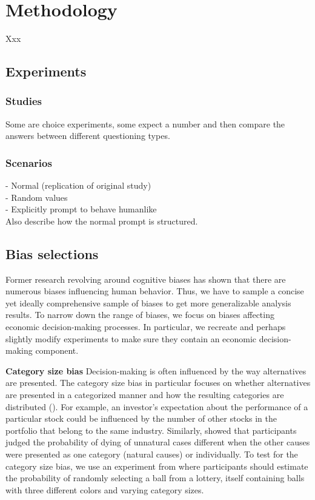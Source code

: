 \section{Methodology}
Xxx

\subsection{Experiments}
\subsubsection{Studies}
Some are choice experiments, some expect a number and then compare the answers between different questioning types.

\subsubsection{Scenarios}
- Normal (replication of original study) \\
- Random values \\
- Explicitly prompt to behave humanlike \\

Also describe how the normal prompt is structured.


\subsection{Bias selections}
\par Former research revolving around cognitive biases has shown that there are numerous biases influencing human behavior. Thus, we have to sample a concise yet ideally comprehensive sample of biases to get more generalizable analysis results. To narrow down the range of biases, we focus on biases affecting economic decision-making processes. In particular, we recreate and perhaps slightly modify experiments to make sure they contain an economic decision-making component. 

\setlength{\parindent}{20pt}
\par \textbf{Category size bias} Decision-making is often influenced by the way alternatives are presented. The category size bias in particular focuses on whether alternatives are presented in a categorized manner and how the resulting categories are distributed (\cite{isaac2014judging}). For example, an investor's expectation about the performance of a particular stock could be influenced by the number of other stocks in the portfolio that belong to the same industry. Similarly, \cite{tversky1994support} showed that participants judged the probability of dying of unnatural cases different when the other causes were presented as one category (natural causes) or individually. To test for the category size bias, we use an experiment from \cite{isaac2014judging} where participants should estimate the probability of randomly selecting a ball from a lottery, itself containing balls with three different colors and varying category sizes.

